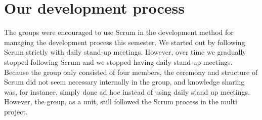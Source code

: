 \section{Our development process}
The groups were encouraged to use Scrum in the \giraf development method for managing the development process this semester. We started out by following Scrum strictly with daily stand-up meetings. However, over time we gradually stopped following Scrum and we stopped having daily stand-up meetings. Because the group only consisted of four members, the ceremony and structure of Scrum did not seem necessary internally in the group, and knowledge sharing was, for instance, simply done ad hoc instead of using daily stand up meetings. However, the group, as a unit, still followed the Scrum process in the multi project. 

